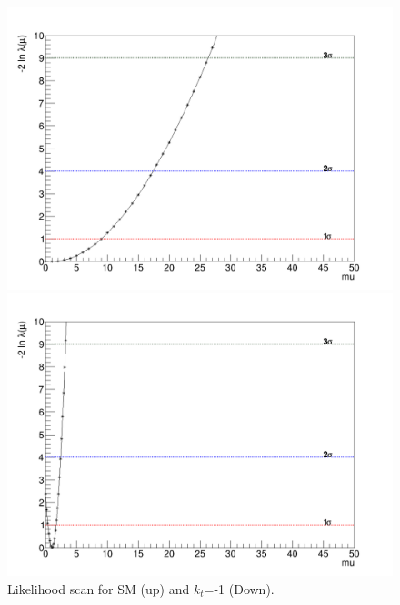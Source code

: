 	\begin{figure}[ht]
		\centering
		\begin{minipage}[b]{0.7\textwidth}
			\includegraphics[width=\textwidth]{Chapter4/Likelihood.png}
		\end{minipage}
		\hfill
		\begin{minipage}[b]{0.7\textwidth}
			\includegraphics[width=\textwidth]{Chapter4/Likelihood-kt-1.png}
		\end{minipage}
		\caption{Likelihood scan for SM (up) and $k_t$=-1 (Down).}
		\label{scanl}
	\end{figure}
	\pagebreak
	
